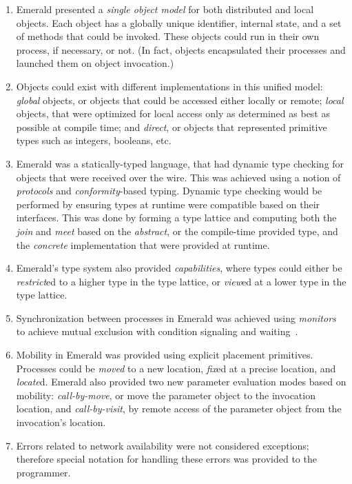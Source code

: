 \begin{enumerate}
\item Emerald presented a \textit{single object model} for both distributed and local objects.  Each object has a globally unique identifier, internal state, and a set of methods that could be invoked.  These objects could run in their own process, if necessary, or not.  (In fact, objects encapsulated their processes and launched them on object invocation.)
\item Objects could exist with different implementations in this unified model: \textit{global} objects, or objects that could be accessed either locally or remote; \textit{local} objects, that were optimized for local access only as determined as best as possible at compile time; and \textit{direct}, or objects that represented primitive types such as integers, booleans, etc.
\item Emerald was a statically-typed language, that had dynamic type checking for objects that were received over the wire.  This was achieved using a notion of \textit{protocols} and \textit{conformity}-based typing.  Dynamic type checking would be performed by ensuring types at runtime were compatible based on their interfaces.  This was done by forming a type lattice and computing both the \textit{join} and \textit{meet} based on the \textit{abstract}, or the compile-time provided type, and the \textit{concrete} implementation that were provided at runtime.
\item Emerald's type system also provided \textit{capabilities}, where types could either be \textit{restrict}ed to a higher type in the type lattice, or \textit{view}ed at a lower type in the type lattice.
\item Synchronization between processes in Emerald was achieved using \textit{monitors} to achieve mutual exclusion with condition signaling and waiting~\cite{hoare1974monitors}.
\item Mobility in Emerald was provided using explicit placement primitives.  Processes could be \textit{moved} to a new location, \textit{fix}ed at a precise location, and \textit{locate}d.  Emerald also provided two new parameter evaluation modes based on mobility: \textit{call-by-move}, or move the parameter object to the invocation location, and \textit{call-by-visit}, by remote access of the parameter object from the invocation's location.
\item Errors related to network availability were not considered exceptions; therefore special notation for handling these errors was provided to the programmer.
\end{enumerate}

